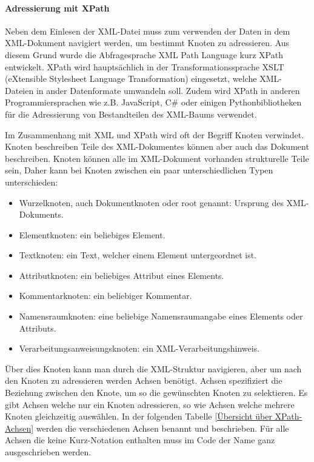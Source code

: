 \paragraph{Adressierung mit XPath}

Neben dem Einlesen der XML-Datei muss zum verwenden der Daten in dem XML-Dokument navigiert werden, um bestimmt Knoten zu adressieren.
Aus diesem Grund wurde die Abfragesprache XML Path Language kurz XPath entwickelt.
XPath wird hauptsächlich in der Transformationssprache XSLT (eXtensible Stylesheet Language Transformation) eingesetzt, welche XML-Dateien in ander Datenformate umwandeln soll.
Zudem wird XPath in anderen Programmiersprachen wie z.B. JavaScript, C# oder einigen Pythonbibliotheken für die Adressierung von Bestandteilen des XML-Baums verwendet.

Im Zusammenhang mit XML und XPath wird oft der Begriff Knoten verwindet.
Knoten beschreiben Teile des XML-Dokumentes können aber auch das Dokument beschreiben.
Knoten können alle im XML-Dokument vorhanden strukturelle Teile sein,
Daher kann bei Knoten zwischen ein paar unterschiedlichen Typen unterschieden:

\begin{itemize}
\item Wurzelknoten, auch Dokumentknoten oder root genannt: Ursprung des XML-Dokuments.
\item Elementknoten: ein beliebiges Element.
\item Textknoten: ein Text, welcher einem Element untergeordnet ist.
\item Attributknoten: ein beliebiges Attribut eines Elements.
\item Kommentarknoten: ein beliebiger Kommentar.
\item Namensraumknoten: eine beliebige Namensraumangabe eines Elements oder Attributs.
\item Verarbeitungsanweisungsknoten: ein XML-Verarbeitungshinweis.
\end{itemize}

Über dies Knoten kann man durch die XML-Struktur navigieren, aber um nach den Knoten zu adressieren werden Achsen benötigt.
Achsen spezifiziert die Beziehung zwischen den Knote, um so die gewünschten Knoten zu selektieren.
Es gibt Achsen welche nur ein Knoten adressieren, so wie Achsen welche mehrere Knoten gleichzeitig auswählen.
In der folgenden Tabelle \ref{Übersicht über XPath-Achsen} werden die verschiedenen Achsen benannt und beschrieben.
Für alle Achsen die keine Kurz-Notation enthalten muss im Code der Name ganz ausgeschrieben werden.


